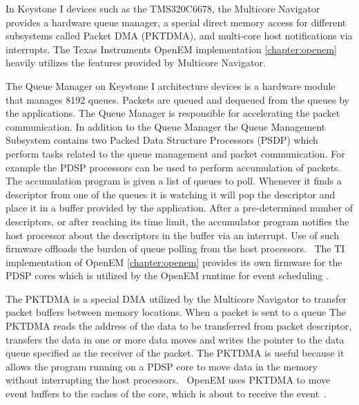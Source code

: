 In Keystone I devices such as the TMS320C6678, the Multicore Navigator provides a hardware queue manager, a special direct memory access for different subsystems called Packet DMA (PKTDMA), and multi-core host notifications via interrupts. \cite{navigator} The Texas Instruments OpenEM implementation \ref{chapter:openem} heavily utilizes the features provided by Multicore Navigator.

The Queue Manager on Keystone I architecture devices is a hardware module that manages 8192 queues. Packets are queued and dequeued from the queues by the applications. The Queue Manager is responsible for accelerating the packet communication. In addition to the Queue Manager the Queue Management Subsystem contains two Packed Data Structure Processors (PSDP) which perform tasks related to the queue management and packet communication. For example the PDSP processors can be used to perform accumulation of packets. The accumulation program is given a list of queues to poll. Whenever it finds a descriptor from one of the queues it is watching it will pop the descriptor and place it in a buffer provided by the application. After a pre-determined number of descriptors, or after reaching its time limit, the accumulator program notifies the host processor about the descriptors in the buffer via an interrupt. Use of such firmware offloads the burden of queue polling from the host processors.~\cite{navigator} The TI implementation of OpenEM \ref{chapter:openem} provides its own firmware for the PDSP cores which is utilized by the OpenEM runtime for event scheduling \cite{moerman2014open}.

The PKTDMA is a special DMA utilized by the Multicore Navigator to transfer packet buffers between memory locations. When a packet is sent to a queue The PKTDMA reads the address of the data to be transferred from packet descriptor, transfers the data in one or more data moves and writes the pointer to the data queue specified as the receiver of the packet. The PKTDMA is useful because it allows the program running on a PDSP core to move data in the memory without interrupting the host processors.~\cite{navigator} OpenEM uses PKTDMA to move event buffers to the caches of the core, which is about to receive the event~\cite{moerman2014open}.

